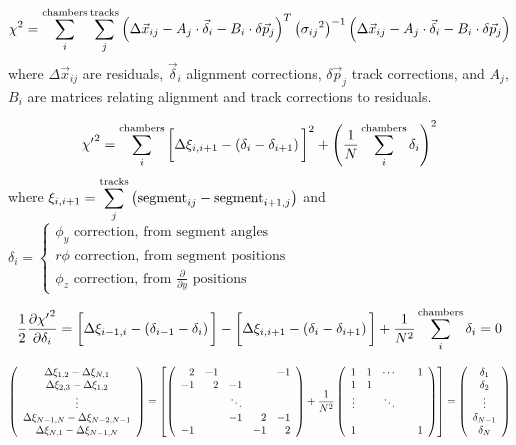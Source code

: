 \documentclass[12pt]{article}
\begin{document}
\[
\chi^2 = \sum_i^{\mbox{\scriptsize chambers}} \sum_j^{\mbox{\scriptsize tracks}} \left(\Delta \vec{x}_{ij} - A_j \cdot \vec{\delta}_i - B_i \cdot \delta \vec{p}_j \right)^T
\left({\sigma_{ij}}^2\right)^{-1}
\left(\Delta \vec{x}_{ij} - A_j \cdot \vec{\delta}_i - B_i \cdot \delta \vec{p}_j \right)
\]
where $\Delta \vec{x}_{ij}$ are residuals, $\vec{\delta}_i$ alignment
corrections, $\delta \vec{p}_j$ track corrections, and $A_j$, $B_i$
are matrices relating alignment and track corrections to residuals.


\[
{\chi'}^2 = \sum_i^{\mbox{\scriptsize chambers}} \bigg[ \Delta \xi_{i,i+1} - \left(\delta_i - \delta_{i+1}\right) \bigg]^2 + \left(\frac{1}{N} \sum_i^{\mbox{\scriptsize chambers}} \delta_i \right)^2
\]
where $\displaystyle \xi_{i,i+1} = \sum_j^{\mbox{\scriptsize tracks}} \left( \mbox{segment}_{ij} - \mbox{segment}_{i+1,j} \right)$ and $\delta_i = \left\{ \begin{array}{l} \phi_y\mbox{ correction, from segment angles} \\ r\phi\mbox{ correction, from segment positions} \\ \phi_z\mbox{ correction, from $\frac{\partial}{\partial y}$ positions} \end{array} \right.$

\[
\frac{1}{2} \frac{\partial {\chi'}^2}{\partial \delta_i} = \bigg[\Delta \xi_{i-1,i} - \left(\delta_{i-1} - \delta_i\right)\bigg] - \bigg[\Delta \xi_{i,i+1} - \left(\delta_i - \delta_{i+1}\right)\bigg] + \frac{1}{N^2} \sum_i^{\mbox{\scriptsize chambers}} \delta_i = 0
\]

\[
\left(\begin{array}{c}
\Delta\xi_{1,2} - \Delta\xi_{N,1} \\
\Delta\xi_{2,3} - \Delta\xi_{1,2} \\
\vdots \\
\Delta\xi_{N-1,N} - \Delta\xi_{N-2,N-1} \\
\Delta\xi_{N,1} - \Delta\xi_{N-1,N} \\
\end{array}\right) = 
\left[\left(\begin{array}{r r r r r}
2 & -1 &  & & -1 \\
-1 & 2 & -1  &  \\
 & & \ddots &  &  \\
 & & -1 & 2 & -1 \\
-1 &  &  & -1 & 2 \\
\end{array}\right) + \frac{1}{N^2} \left(\begin{array}{c c c c c}
1 & 1 & \cdots &  & 1 \\
1 & 1 &  &  &  \\
\vdots &  & \ddots & & \\
 & & & & \\
1 & &  & & 1 \\
\end{array}\right)\right] =
\left(\begin{array}{c} \delta_1 \\ \delta_2 \\ \vdots \\ \delta_{N-1} \\ \delta_N \end{array} \right)
\]
\end{document}
